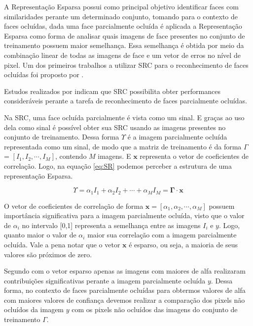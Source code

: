 A Representação Esparsa possui como principal objetivo identificar faces com similaridades perante um determinado conjunto, tomando para o contexto de faces ocluídas, dada uma face parcialmente ocluída é aplicada a Representação Esparsa como forma de analisar quais imagens de face presentes no conjunto de treinamento possuem maior semelhança. Essa semelhança é obtida por meio da combinação linear de todas as imagens de face e um vetor de erros no nível de pixel. Um dos primeiros trabalhos a utilizar SRC para o reconhecimento de faces ocluídas foi proposto por .

Estudos realizados por  indicam que SRC possibilita obter performances consideráveis perante a tarefa de reconhecimento de faces parcialmente ocluídas. 

Na SRC, uma face ocluída parcialmente é vista como um sinal. E graças ao uso dela como sinal é possível obter sua SRC usando as imagens presentes no conjunto de treinamento. Dessa forma $\Upsilon$ é a imagem parcialmente ocluída representada como um sinal, de modo que a matriz de treinamento é da forma $\Gamma$ = $[I_1,I_2,\cdots, I_M]$, contendo $M$ imagens. E $\mathbf{x}$ representa o vetor de coeficientes de correlação. Logo, na equação \ref{eq:SR} podemos perceber a estrutura de uma representação Esparsa.

\begin{equation}
\Upsilon = \alpha_1I_1 + \alpha_2I_2 + \cdots + \alpha_MI_M = \mathbf{\Gamma} \cdot \mathbf{x}
\label{eq:SR}
\end{equation}

O vetor de coeficientes de correlação de forma $\mathbf{x} = [\alpha_1,\alpha_2, \cdots, \alpha_M]$ possuem importância significativa para a imagem parcialmente ocluída, visto que o valor de $\alpha_i$ no intervalo [0,1] representa a semelhança entre as imagens $I_i$ e $y$. Logo, quanto maior o valor de $\alpha_i$ maior sua correlação com a imagem parcialmente ocluída. Vale a pena notar que o vetor $\mathbf{x}$ é esparso, ou seja, a maioria de seus valores são próximos de zero. 

Segundo  com o vetor esparso apenas as imagens com maiores de alfa realizaram contribuições significativas perante a imagem parcialmente ocluída $y$. Dessa forma, no contexto de faces parcialmente ocluídas para obtermos valores de alfa com maiores valores de confiança devemos realizar a comparação dos pixels não ocluídos da imagem $y$ com os pixels não ocluídos das imagens do conjunto de treinamento $\Gamma$.

